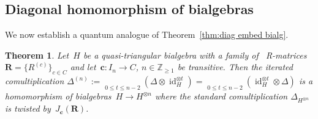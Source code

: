 \documentclass[12pt, reqno]{amsart}
\newtheorem{theorem}{Theorem}[section]
\theoremstyle{definition}
\newcommand{\dscprod}{\mathop{\overleftarrow{\prod}}}
\numberwithin{equation}{section}
\newcommand{\tensor}{\otimes}
\newcommand{\ZZ}{{\mathbb Z}}
\DeclareMathOperator{\id}{id}
\begin{document}
\subsection{Diagonal homomorphism of bialgebras}
We now establish a quantum analogue of Theorem~\ref{thm:diag embed bialg}.
\begin{theorem}\label{thm:diag embed quantum}
Let~$H$ be a quasi-triangular bialgebra with a family of ~R-matrices
$\mathbf R=\{ R^{(c)}\}_{c\in C}$ and let~$\mathbf c:I_n\to C$, $n\in\ZZ_{\ge1}$ be transitive.
Then the iterated comultiplication $\Delta^{(n)}:=
\dscprod\limits_{0\le t\le n-2}(\Delta\tensor\id_H^{\tensor t})=
\dscprod\limits_{0\le t\le n-2}(\id_H^{\tensor t}\tensor\Delta)$ is
a homomorphism of bialgebras~$H\to H^{\tensor n}$ where
the standard comultiplication $\Delta_{H^{\tensor n}}$ is twisted by~$J_{\mathbf c}(\mathbf R)$.
\end{theorem}
\end{document}
